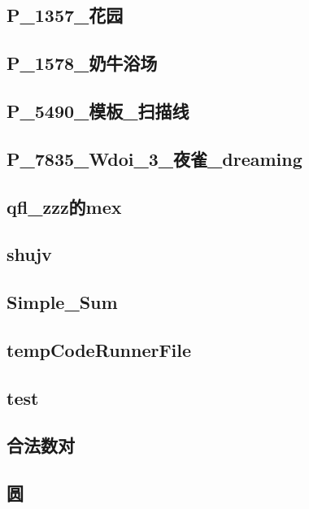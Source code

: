 \subsection{P_1357_花园}
\raggedbottom
\hrulefill

\subsection{P_1578_奶牛浴场}
\raggedbottom
\hrulefill

\subsection{P_5490_模板_扫描线}
\raggedbottom
\hrulefill

\subsection{P_7835_Wdoi_3_夜雀_dreaming}
\raggedbottom
\hrulefill

\subsection{qfl_zzz的mex}
\raggedbottom
\hrulefill

\subsection{shujv}
\raggedbottom
\hrulefill

\subsection{Simple_Sum}
\raggedbottom
\hrulefill

\subsection{tempCodeRunnerFile}
\raggedbottom
\hrulefill

\subsection{test}
\raggedbottom
\hrulefill

\subsection{合法数对}
\raggedbottom
\hrulefill

\subsection{圆}
\raggedbottom
\hrulefill

